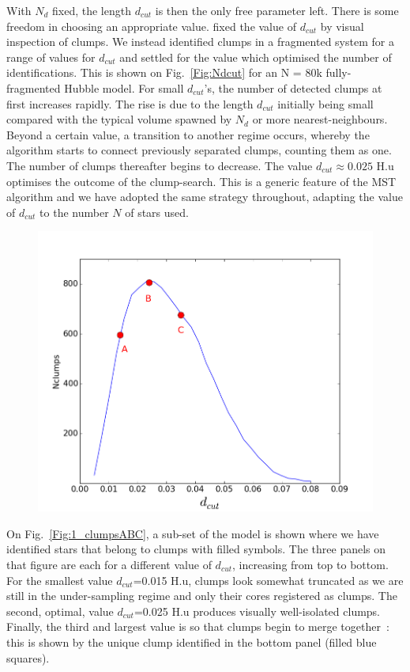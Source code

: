 With $N_d$ fixed, the length $d_{cut}$ is then the only free parameter left. There is some freedom 
in choosing an appropriate value. 
\cite{Maschberger2010} fixed the value of  $d_{cut}$ by visual inspection of clumps.
 We instead  identified  clumps in a fragmented system for a range of values for $d_{cut}$ and settled for the value  which optimised the number of identifications. This is shown on Fig.~\ref{Fig:Ndcut} for an N = 80k fully-fragmented Hubble model. For small $d_{cut}$'s, the number of detected clumps at first  increases rapidly. The rise is due  to the length $d_{cut}$ initially being small compared with the typical volume spawned by $N_d$ or more  nearest-neighbours. Beyond a certain value, a transition to another regime occurs, whereby the algorithm starts to connect previously separated clumps, counting them as one. The number of clumps thereafter begins to decrease. The value $d_{cut} \approx 0.025$ H.u optimises the outcome of the clump-search. This is a generic feature of the MST algorithm and we have adopted the same strategy throughout, adapting the value of $d_{cut}$ to the number $N$ of stars used. 
 
 
\begin{figure}
\begin{center}
\includegraphics[width=0.6\columnwidth]{Figures/1_Ndcut.png}
\end{center}
\caption{}
\label{Fig:1_Ndcut}
\end{figure} 
 
   On Fig.~\ref{Fig:1_clumpsABC}, a sub-set of the model is shown where we have identified stars that belong to clumps with filled symbols. The three panels on that figure are each for a different value of $d_{cut}$, increasing from top to bottom. For the smallest value $d_{cut}$=0.015 H.u, clumps look somewhat truncated as we are still in the under-sampling regime and only their cores registered as clumps. The second, optimal, value $d_{cut}$=0.025 H.u produces visually well-isolated clumps. Finally, the third and  largest value is so that clumps begin to merge together~: this is shown by the unique clump identified in the bottom panel (filled blue squares).
   


